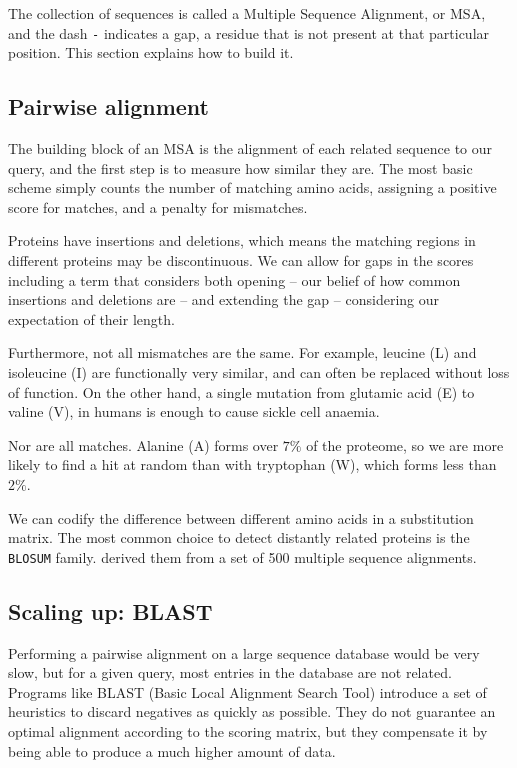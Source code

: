 The collection of sequences is called a Multiple Sequence Alignment, or MSA, and the dash \texttt{-} indicates a gap, a residue that is not present at that particular position.
This section explains how to build it.


\subsection{Pairwise alignment}
The building block of an MSA is the alignment of each related sequence to our query, and the first step is to measure how similar they are.
The most basic scheme simply counts the number of matching amino acids, assigning a positive score for matches, and a penalty for mismatches.

Proteins  have insertions and deletions, which means the matching regions in different proteins may be discontinuous.
We can allow for gaps in the scores including a term that considers both opening -- our belief of how common insertions and deletions are -- and extending the gap -- considering our expectation of their length.

Furthermore, not all mismatches are the same.
For example, leucine (L) and isoleucine (I) are functionally very similar, and can often be replaced without loss of function.
On the other hand, a single mutation from glutamic acid (E) to valine (V), in humans is enough to cause sickle cell anaemia.

Nor are all matches.
Alanine (A) forms over $7\%$ of the proteome, so we are more likely to find a hit at random than with tryptophan (W), which forms less than $2\%$.

We can codify  the difference between different amino acids in a substitution matrix.
The most common choice to detect distantly related proteins is the \texttt{BLOSUM} family.
\citet{blosum} derived them from a set of 500 multiple sequence alignments.

\subsection{Scaling up: BLAST}
Performing a pairwise alignment on a large sequence database would be very slow, but for a given query, most entries in the database are not related.
Programs like BLAST (Basic Local Alignment Search Tool) introduce a set of heuristics to discard negatives as quickly as possible.
They do not guarantee an optimal alignment according to the scoring matrix, but they compensate it by being able to produce a much higher amount of data.

